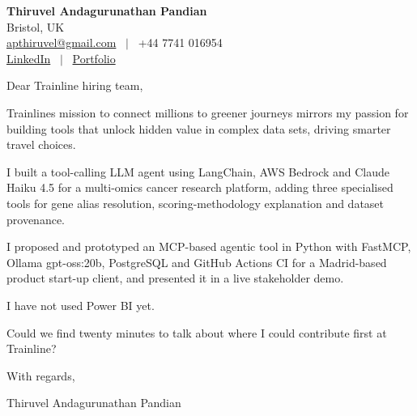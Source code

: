 \documentclass[11pt,a4paper]{article}
\begin{document}
\raggedright
\pagestyle{empty}

\begin{center}
    {\LARGE \color{linkblue} \textbf{Thiruvel Andagurunathan Pandian}}\\[0.2cm]
    Bristol, UK \\
    \href{mailto:apthiruvel@gmail.com}{apthiruvel@gmail.com} \ $|$ \ +44 7741 016954 \\
\href{https://www.linkedin.com/in/thiruvel-a-p/}{LinkedIn} \ $|$ \ \href{https://thiruvel-ap.github.io/PersonalPortfolio/}{Portfolio}
\end{center}

\vspace{0.4cm}

\noindent
Dear Trainline hiring team,

Trainline\textquotesingle{}s mission to connect millions to greener journeys mirrors my passion for building tools that unlock hidden value in complex data sets, driving smarter travel choices.

I built a tool-calling LLM agent using LangChain, AWS Bedrock and Claude Haiku 4.5 for a multi-omics cancer research platform, adding three specialised tools for gene alias resolution, scoring-methodology explanation and dataset provenance.

I proposed and prototyped an MCP-based agentic tool in Python with FastMCP, Ollama gpt-oss:20b, PostgreSQL and GitHub Actions CI for a Madrid-based product start-up client, and presented it in a live stakeholder demo.

I have not used Power BI yet.

Could we find twenty minutes to talk about where I could contribute first at Trainline?

\vspace{0.5cm}

With regards,

Thiruvel Andagurunathan Pandian
\end{document}
